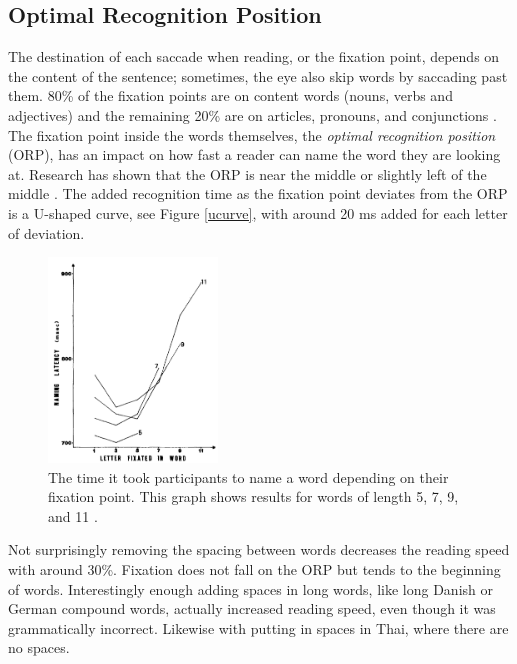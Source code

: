 \subsection{Optimal Recognition Position} \label{ORP}
The destination of each saccade when reading, or the fixation point, depends on the content of the sentence; sometimes, the eye also skip words by saccading past them. 80\% of the fixation points are on content words (nouns, verbs and adjectives) and the remaining 20\% are on articles, pronouns, and conjunctions \cite{eysenck_cognitive_2010}. The fixation point inside the words themselves, the \textit{optimal recognition position} (ORP), has an impact on how fast a reader can name the word they are looking at. Research has shown that the ORP is near the middle or slightly left of the middle \cite{oregan_optimal_1992, nazir_letter_1998, oregan_convenient_1984}. The added recognition time as the fixation point deviates from the ORP is a U-shaped curve, see Figure \ref{ucurve}, with around 20 ms added for each letter of deviation.


\begin{figure}[htbp]
\centering
\includegraphics[width=0.4\textwidth]{Pics/ucurve}
\caption{The time it took participants to name a word depending on their fixation point. This graph shows results for words of length 5, 7, 9, and 11 \protect\cite{oregan_convenient_1984}.}
\label{fig:ucurve}
\end{figure}

Not surprisingly removing the spacing between words decreases the reading speed with around 30\%. Fixation does not fall on the ORP but tends to the beginning of words. Interestingly enough adding spaces in long words, like long Danish or German compound words, actually increased reading speed, even though it was grammatically incorrect. Likewise with putting in spaces in Thai, where there are no spaces.

